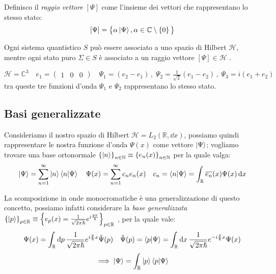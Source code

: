 \begin{definition}
    Definisco il \textit{raggio vettore} \([\Psi]\) come l'insieme dei vettori che rappresentano lo stesso stato:
    \[
    [\Psi ]= \big\{ \alpha\ket{\Psi}, \alpha \in \mathbb{C} \setminus \left\{ 0 \right\} \big\}
    \]
\end{definition}

\begin{postulato1}
    Ogni sistema quantistico \(S\) può essere associato a uno spazio di Hilbert \(\mathcal{H}\), 
    mentre ogni stato puro \(\Sigma \in S\) è associato a un raggio vettore \([\Psi ]\in \mathcal{H}\) .
\end{postulato1}


\begin{example}
    \(\mathcal{H}= \mathbb{C}^3 \quad e_1= \begin{pmatrix}
        1   & 0 & 0
    \end{pmatrix}\quad  \Psi_1= (e_2-e_1)\,,\; \Psi_2= \frac{1}{\sqrt{2}}\left( e_1-e_2 \right)\,,\; \Psi_3 = i(e_1+e_2)\)
    tra queste tre funzioni d'onda \(\Psi_1 \) e \( \Psi_2 \) rappresentano lo stesso stato.
\end{example}


\subsection{Basi generalizzate}

Consideriamo il nostro spazio di Hilbert \(\mathcal{H} = L_2(\mathbb{R}, \dd{x})\), 
possiamo quindi rappresentare le nostra funzione d'onda \(\Psi(x)\) come vettore \(\ket{\Psi}\); 
vogliamo trovare una base ortonormale \(\left\{ \ket{n} \right\}_{n \in \mathbb{N}} \equiv \left\{ e_n(x) \right\}_{n \in \mathbb{N}}\) 
per la quale valga:
\[
    \ket{\Psi}= \sum_{n= 1}^{\infty} \ket{n}\braket{n}{\Psi} \quad \Psi(x)= \sum_{n=1}^{\infty}c_n e_n(x)
    \quad c_n = \braket{n}{\Psi}= \int_{\mathbb{R}} \overline{e_n}(x)\Psi(x)\dd{x}
\]

La scomposizione in onde monocromatiche è una generalizzazione di questo concetto,
possiamo infatti considerare la \textit{base generalizzata} \(\left\{ \ket{p} \right\}_{p \in \mathbb{R}}\equiv \left\{ e_p(x) = \frac{1}{\sqrt{2\pi\hbar}} e^{i\frac{px}{\hbar}} \right\}_{p \in \mathbb{R}}\) ,
per la quale vale:
\begin{equation*}
    \Psi(x)= \int_{\mathbb{R}} \dd{p} \frac{1}{\sqrt{2\pi\hbar}} e^{i\frac{p}{\hbar}x}\tilde{\Psi}(p) \quad 
    \tilde{\Psi}(p)= \braket{p}{\Psi} = \int_\mathbb{R} \dd{x} \frac{1}{\sqrt{2\pi\hbar}} e^{-i\frac{p}{\hbar}x}\Psi(x)
\end{equation*}
\begin{equation}
    \implies \ket{\Psi}= \int_\mathbb{R} \ket{p} \braket{p}{\Psi}
\end{equation}

